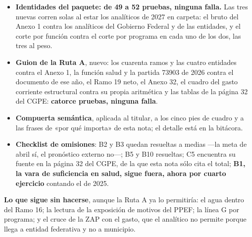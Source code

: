 \begin{itemize}
\item \textbf{Identidades del paquete: de 49 a 52 pruebas, ninguna falla.} Las tres nuevas
corren solas al estar los analíticos de 2027 en carpeta: el bruto del Anexo 1 contra los
analíticos del Gobierno Federal y de las entidades, y el corte por función contra el corte
por programa en cada uno de los dos, las tres al peso.
\item \textbf{Guion de la Ruta A}, nuevo: los cuarenta ramos y las cuatro entidades contra el
Anexo 1, la función salud y la partida 73903 de 2026 contra el documento de ese año, el Ramo
19 neto, el Anexo 32, el cuadro del gasto corriente estructural contra su propia aritmética
y las tablas de la página 32 del CGPE: \textbf{catorce pruebas, ninguna falla}.
\item \textbf{Compuerta semántica}, aplicada al titular, a los cinco pies de cuadro y a las
frases de «por qué importa» de esta nota; el detalle está en la bitácora.
\item \textbf{Checklist de omisiones}: B2 y B3 quedan resueltas a medias ---la meta de abril
sí, el pronóstico externo no---; B5 y B10 resueltas; C5 encuentra su fuente en la página 32 del
CGPE, de la que esta nota sólo cita el total; \textbf{B1, la vara de suficiencia en salud, sigue fuera, ahora por cuarto ejercicio}
contando el de 2025.
\end{itemize}

\textbf{Lo que sigue sin hacerse}, aunque la Ruta A ya lo permitiría: el agua dentro del Ramo
16; la lectura de la exposición de motivos del PPEF; la línea G por programa; y el cruce de
la ZAP con el gasto, que el analítico no permite porque llega a entidad federativa y no a
municipio.

